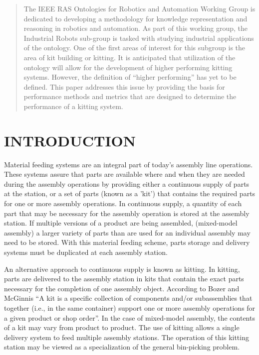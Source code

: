 




\maketitle
\thispagestyle{empty}
\pagestyle{empty}


\begin{abstract}

The IEEE RAS Ontologies for Robotics and Automation Working Group is dedicated to 
developing a methodology for knowledge representation and reasoning in robotics 
and automation. As part of this working group, the Industrial Robots sub-group is 
tasked with studying industrial applications of the ontology. One of the first 
areas of interest for this subgroup is the area of kit building or kitting. 
It is anticipated that utilization of the ontology will allow for the development 
of higher performing kitting systems. However, the definition of ``higher performing''
has yet to be defined. This paper addresses this issue by providing the basis 
for performance methods and metrics that are designed to
determine the performance of a kitting system.
\end{abstract}


\section{INTRODUCTION}
Material feeding systems are an integral part of today's assembly line operations. 
These systems assure that parts are available where and when 
they are needed during the assembly operations by providing either a continuous 
supply of parts at the station, or a set of parts (known
as a 'kit') that contains the required parts for one or more assembly operations. 
In continuous supply, a quantity of each part that
may be necessary for the assembly operation is stored at the assembly station. 
If multiple versions of a product are being assembled, (mixed-model assembly)
a larger variety of parts than are used for an individual assembly may need 
to be stored. With this material feeding scheme, parts
storage and delivery systems must be duplicated at each assembly station.

An alternative approach to continuous supply is known as kitting. In kitting, 
parts are delivered to the assembly station in kits that contain
the exact parts necessary for the completion of one assembly object. 
According to Bozer and McGinnis \cite{Bozer1992} ``A kit is a specific
collection of components and/or subassemblies that together
(i.e., in the same container) support one or more assembly 
operations for a given product or shop order''. In the case of mixed-model
assembly, the contents of a kit may vary from product to product.
The use of kitting allows a single delivery system to feed
multiple assembly stations. The operation of this kitting 
station may be viewed as a specialization of the general bin-picking problem. 

